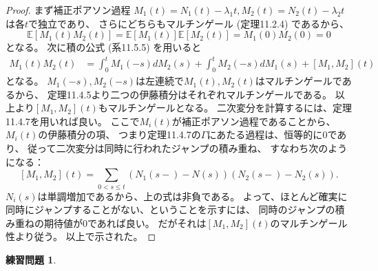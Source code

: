 \documentclass[uplatex]{jsarticle}
\theoremstyle{definition}
\newtheorem{prob}[prob]{練習問題}
\def\E{\mathbb{E}}
\begin{document}
\begin{proof}
  まず補正ポアソン過程
  \(M_1(t)=N_1(t)-\lambda_1t, M_2(t)=N_2(t)-\lambda_2t\)
  は各\(t\)で独立であり、
  さらにどちらもマルチンゲール (定理11.2.4) であるから、
  \[\E[M_1(t)M_2(t)]=\E[M_1(t)]\E[M_2(t)]=M_1(0)M_2(0)=0\]
  となる。
  次に積の公式 (系11.5.5) を用いると
  \begin{align*}
    M_1(t)M_2(t)
    &= \int_0^tM_1(-s)dM_2(s) + \int_0^tM_2(-s)dM_1(s)
    + [M_1,M_2](t)
  \end{align*}
  となる。
  \(M_1(-s),M_2(-s)\)は左連続で\(M_1(t),M_2(t)\)はマルチンゲールであるから、
  定理11.4.5より二つの伊藤積分はそれぞれマルチンゲールである。
  以上より\([M_1,M_2](t)\)もマルチンゲールとなる。
  二次変分を計算するには、定理11.4.7を用いれば良い。
  ここで\(M_i(t)\)が補正ポアソン過程であることから、
  \(M_i(t)\)の伊藤積分の項、
  つまり定理11.4.7の\(\Gamma\)にあたる過程は、恒等的に\(0\)であり、
  従って二次変分は同時に行われたジャンプの積み重ね、
  すなわち次のようになる：
  \[
  [M_1,M_2](t) = \sum_{0< s \leq t}
  \left(N_1(s-)-N(s)\right)\left(N_2(s-)-N_2(s)\right).
  \]
  \(N_i(s)\)は単調増加であるから、上の式は非負である。
  よって、ほとんど確実に同時にジャンプすることがない、ということを示すには、
  同時のジャンプの積み重ねの期待値が\(0\)であれば良い。
  だがそれは\([M_1,M_2](t)\)のマルチンゲール性より従う。
  以上で示された。
\end{proof}














\begin{prob}\label{prob: 11.5}
\end{prob}
\end{document}
